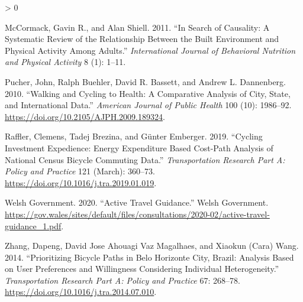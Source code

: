 \documentclass[galley]{jtlu-article-2col}
\newlength{\cslhangindent}
\newenvironment{CSLReferences}[2] %
 {%
  \setlength{\parindent}{0pt}
  \ifodd #1 \everypar{\setlength{\hangindent}{\cslhangindent}}\ignorespaces\fi
  \ifnum #2 > 0
  \setlength{\parskip}{#2\baselineskip}
  \fi
 }%
 {}
\begin{document}
\begin{CSLReferences}{1}{0}
\leavevmode\hypertarget{ref-mccormack_search_2011}{}%
McCormack, Gavin R., and Alan Shiell. 2011. {``In Search of Causality: A Systematic Review of the Relationship Between the Built Environment and Physical Activity Among Adults.''} \emph{International Journal of Behavioral Nutrition and Physical Activity} 8 (1): 1--11.

\leavevmode\hypertarget{ref-pucher_walking_2010}{}%
Pucher, John, Ralph Buehler, David R. Bassett, and Andrew L. Dannenberg. 2010. {``Walking and Cycling to Health: {A} Comparative Analysis of City, State, and International Data.''} \emph{American Journal of Public Health} 100 (10): 1986--92. \url{https://doi.org/10.2105/AJPH.2009.189324}.

\leavevmode\hypertarget{ref-raffler_cycling_2019}{}%
Raffler, Clemens, Tadej Brezina, and Günter Emberger. 2019. {``Cycling Investment Expedience: {Energy} Expenditure Based {Cost}-{Path Analysis} of National Census Bicycle Commuting Data.''} \emph{Transportation Research Part A: Policy and Practice} 121 (March): 360--73. \url{https://doi.org/10.1016/j.tra.2019.01.019}.

\leavevmode\hypertarget{ref-welshgovernment_active_2020}{}%
Welsh Government. 2020. {``Active {Travel Guidance}.''} {Welsh Government}. \url{https://gov.wales/sites/default/files/consultations/2020-02/active-travel-guidance_1.pdf}.

\leavevmode\hypertarget{ref-zhang_prioritizing_2014}{}%
Zhang, Dapeng, David Jose Ahouagi Vaz Magalhaes, and Xiaokun (Cara) Wang. 2014. {``Prioritizing Bicycle Paths in {Belo Horizonte City}, {Brazil}: {Analysis} Based on User Preferences and Willingness Considering Individual Heterogeneity.''} \emph{Transportation Research Part A: Policy and Practice} 67: 268--78. \url{https://doi.org/10.1016/j.tra.2014.07.010}.

\end{CSLReferences}

%
%
%
%
%
%
%
%







\end{document}
